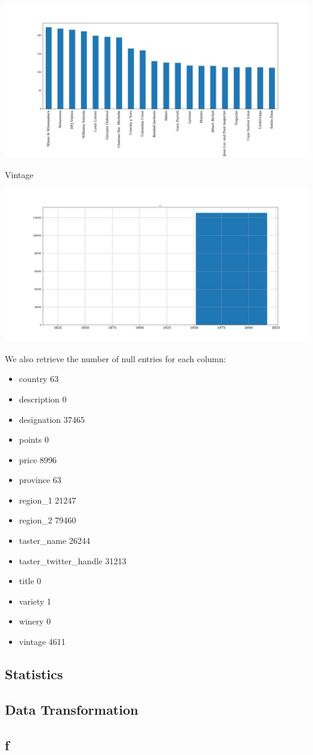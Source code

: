 \documentclass[11pt]{article}
\begin{document}
\includegraphics[width=\textwidth,height=\textheight,keepaspectratio]{figures/1c_histogram_of_winery.png}

Vintage

\includegraphics[width=\textwidth,height=\textheight,keepaspectratio]{figures/1c_histogram_of_vintage.png}

We also retrieve the number of null entries for each column:

\begin{itemize}
    \item country                     63
    \item description                  0
    \item designation              37465
    \item points                       0
    \item price                     8996
    \item province                    63
    \item region\_1                 21247
    \item region\_2                 79460
    \item taster\_name              26244
    \item taster\_twitter\_handle    31213
    \item title                        0
    \item variety                      1
    \item winery                       0
    \item vintage                   4611
\end{itemize}

\subsection{Statistics}
\subsection{Data Transformation}
\subsection{f}



\end{document}
